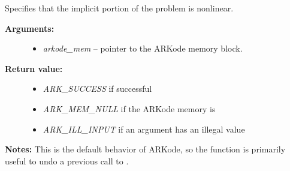 \documentclass[letterpaper,10pt,english]{sphinxmanual}
\begin{document}
\begin{fulllineitems}
\label{c_interface/User_callable:ARKodeSetNonlinear}
Specifies that the implicit portion of the problem is nonlinear.
\begin{description}
\item[{\textbf{Arguments:}}] \leavevmode\begin{itemize}
\item {} 
\emph{arkode\_mem} -- pointer to the ARKode memory block.

\end{itemize}

\item[{\textbf{Return value:}}] \leavevmode\begin{itemize}
\item {} 
\emph{ARK\_SUCCESS} if successful

\item {} 
\emph{ARK\_MEM\_NULL} if the ARKode memory is 

\item {} 
\emph{ARK\_ILL\_INPUT} if an argument has an illegal value

\end{itemize}

\end{description}

\textbf{Notes:} This is the default behavior of ARKode, so the function
is primarily useful to undo a previous call to {\hyperref[c_interface/User_callable:ARKodeSetLinear]{}}.

\end{fulllineitems}

\end{document}
